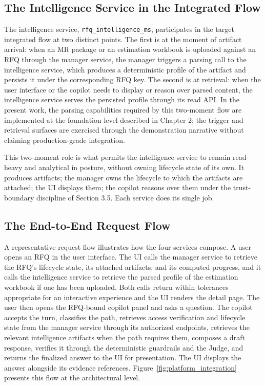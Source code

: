 \subsection*{The Intelligence Service in the Integrated Flow}
The intelligence service, \texttt{rfq\_intelligence\_ms}, participates in the target integrated flow at two distinct points. The first is at the moment of artifact arrival: when an MR package or an estimation workbook is uploaded against an RFQ through the manager service, the manager triggers a parsing call to the intelligence service, which produces a deterministic profile of the artifact and persists it under the corresponding RFQ key. The second is at retrieval: when the user interface or the copilot needs to display or reason over parsed content, the intelligence service serves the persisted profile through its read API. In the present work, the parsing capabilities required by this two-moment flow are implemented at the foundation level described in Chapter 2; the trigger and retrieval surfaces are exercised through the demonstration narrative without claiming production-grade integration.

This two-moment role is what permits the intelligence service to remain read-heavy and analytical in posture, without owning lifecycle state of its own. It produces artifacts; the manager owns the lifecycle to which the artifacts are attached; the UI displays them; the copilot reasons over them under the trust-boundary discipline of Section 3.5. Each service does its single job.

\subsection*{The End-to-End Request Flow}
A representative request flow illustrates how the four services compose. A user opens an RFQ in the user interface. The UI calls the manager service to retrieve the RFQ's lifecycle state, its attached artifacts, and its computed progress, and it calls the intelligence service to retrieve the parsed profile of the estimation workbook if one has been uploaded. Both calls return within tolerances appropriate for an interactive experience and the UI renders the detail page. The user then opens the RFQ-bound copilot panel and asks a question. The copilot accepts the turn, classifies the path, retrieves access verification and lifecycle state from the manager service through its authorized endpoints, retrieves the relevant intelligence artifacts when the path requires them, composes a draft response, verifies it through the deterministic guardrails and the Judge, and returns the finalized answer to the UI for presentation. The UI displays the answer alongside its evidence references. Figure~\ref{fig:platform_integration} presents this flow at the architectural level.

